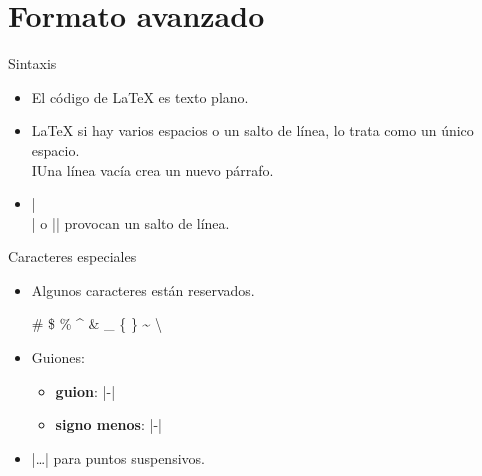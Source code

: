 \section{Formato avanzado}

\begin{frame}[fragile]{Sintaxis}
  \begin{itemize}
    \item El código de \LaTeX{} es texto plano.
    \item \LaTeX{} si hay varios espacios o un salto de línea, lo trata como un único espacio. \\
          IUna línea vacía crea un nuevo párrafo.
    \item \latexinline|\\| o \latexinline|\newline| provocan un salto de línea.
  \end{itemize}
\end{frame}

\begin{frame}[fragile]{Caracteres especiales}
  \begin{itemize}
    \item  Algunos caracteres están reservados.
          \begin{latexcode}
            \# \$ \% \^{} \& \_ \{ \} \~{}
            \textbackslash
          \end{latexcode}
    \item Guiones:
          \begin{itemize}
            \item \textbf{guion}: \latexinline|-|
            \item \textbf{signo menos}: \latexinline|-|
          \end{itemize}
    \item \latexinline|\ldots| para puntos suspensivos.
  \end{itemize}
\end{frame}

